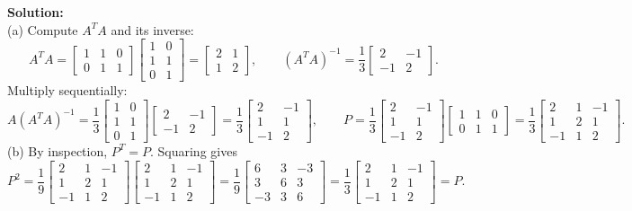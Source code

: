 \documentclass[11pt, letterpaper]{article}
\theoremstyle{definition}
\theoremstyle{remark}
\begin{document}
\textbf{Solution:} \\
(a) Compute $A^T A$ and its inverse:
\[
A^T A = \begin{bmatrix} 1 & 1 & 0 \\ 0 & 1 & 1 \end{bmatrix}\begin{bmatrix} 1 & 0 \\ 1 & 1 \\ 0 & 1 \end{bmatrix} = \begin{bmatrix} 2 & 1 \\ 1 & 2 \end{bmatrix}, \qquad
(A^T A)^{-1} = \frac{1}{3}\begin{bmatrix} 2 & -1 \\ -1 & 2 \end{bmatrix}.
\]
Multiply sequentially:
\[
A(A^T A)^{-1} = \frac{1}{3}\begin{bmatrix} 1 & 0 \\ 1 & 1 \\ 0 & 1 \end{bmatrix}\begin{bmatrix} 2 & -1 \\ -1 & 2 \end{bmatrix} = \frac{1}{3}\begin{bmatrix} 2 & -1 \\ 1 & 1 \\ -1 & 2 \end{bmatrix}, \qquad
P = \frac{1}{3}\begin{bmatrix} 2 & -1 \\ 1 & 1 \\ -1 & 2 \end{bmatrix}\begin{bmatrix} 1 & 1 & 0 \\ 0 & 1 & 1 \end{bmatrix} = \frac{1}{3}\begin{bmatrix} 2 & 1 & -1 \\ 1 & 2 & 1 \\ -1 & 1 & 2 \end{bmatrix}.
\]
(b) By inspection, $P^T = P$. Squaring gives
\[
P^2 = \frac{1}{9}\begin{bmatrix} 2 & 1 & -1 \\ 1 & 2 & 1 \\ -1 & 1 & 2 \end{bmatrix}\begin{bmatrix} 2 & 1 & -1 \\ 1 & 2 & 1 \\ -1 & 1 & 2 \end{bmatrix} = \frac{1}{9}\begin{bmatrix} 6 & 3 & -3 \\ 3 & 6 & 3 \\ -3 & 3 & 6 \end{bmatrix} = \frac{1}{3}\begin{bmatrix} 2 & 1 & -1 \\ 1 & 2 & 1 \\ -1 & 1 & 2 \end{bmatrix} = P.
\]
\end{document}
